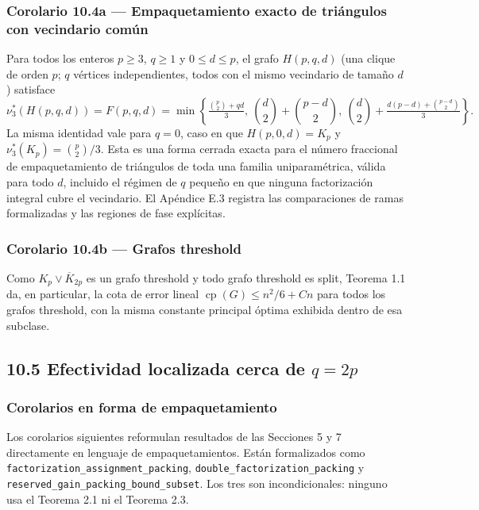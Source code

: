 \documentclass[
  spanish,
  11pt,
  a4paper,
]{article}
\begin{document}
\subsubsection{Corolario 10.4a --- Empaquetamiento exacto de triángulos con vecindario común}\label{corolario-10.4a-empaquetamiento-exacto-de-triuxe1ngulos-con-vecindario-comuxfan}

Para todos los enteros \(p\ge3\), \(q\ge1\) y \(0\le d\le p\), el grafo \(H(p,q,d)\) (una clique de orden \(p\); \(q\) vértices independientes, todos con el mismo vecindario de tamaño \(d\)) satisface \[
\nu_3^*(H(p,q,d))=F(p,q,d)=\min\left\{\tfrac{\binom p2+qd}{3},\ \binom d2+\binom{p-d}2,\ \binom d2+\tfrac{d(p-d)+\binom{p-d}2}{3}\right\}.
\] La misma identidad vale para \(q=0\), caso en que \(H(p,0,d)=K_p\) y \(\nu_3^*(K_p)=\binom p2/3\). Esta es una forma cerrada exacta para el número fraccional de empaquetamiento de triángulos de toda una familia uniparamétrica, válida para todo \(d\), incluido el régimen de \(q\) pequeño en que ninguna factorización integral cubre el vecindario. El Apéndice E.3 registra las comparaciones de ramas formalizadas y las regiones de fase explícitas.

\subsubsection{Corolario 10.4b --- Grafos threshold}\label{corolario-10.4b-grafos-threshold}

Como \(K_p\vee\overline K_{2p}\) es un grafo threshold y todo grafo threshold es split, Teorema 1.1 da, en particular, la cota de error lineal \(\operatorname{cp}(G)\le n^2/6+Cn\) para todos los grafos threshold, con la misma constante principal óptima exhibida dentro de esa subclase.

\subsection{\texorpdfstring{10.5 Efectividad localizada cerca de \(q=2p\)}{10.5 Efectividad localizada cerca de q=2p}}\label{efectividad-localizada-cerca-de-q2p}

\subsubsection{Corolarios en forma de empaquetamiento}\label{corolarios-en-forma-de-empaquetamiento}

Los corolarios siguientes reformulan resultados de las Secciones 5 y 7 directamente en lenguaje de empaquetamientos. Están formalizados como \texttt{factorization\_assignment\_packing}, \texttt{double\_factorization\_packing} y \texttt{reserved\_gain\_packing\_bound\_subset}. Los tres son incondicionales: ninguno usa el Teorema 2.1 ni el Teorema 2.3.
\end{document}
